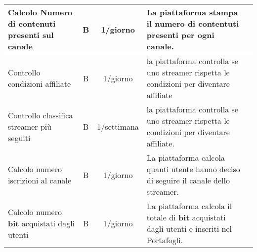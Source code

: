 \begin{longtable}{|l|c|c|p{2.5cm}|c}
  Calcolo Numero di contenuti presenti sul canale &B& 1/giorno &La piattaforma stampa il numero di contentuti presenti per ogni canale. \\\hline
  Controllo condizioni affiliate & B &1/giorno & la piattaforma controlla se uno streamer rispetta le condizioni per diventare affiliate  \\\hline
  Controllo classifica streamer più seguiti & B & 1/settimana  & la piattaforma controlla se uno streamer rispetta le condizioni per diventare affiliate. \\\hline
  Calcolo numero iscrizioni al canale &B&1/giorno&La piattaforma calcola quanti utente hanno deciso di seguire il canale dello streamer.\\\hline
  Calcolo numero \textbf{bit} acquistati dagli utenti &B& 1/giorno &La piattaforma calcola il totale di \textbf{bit} acquistati dagli utenti e inseriti nel Portafogli.\\\hline
\end{longtable}
\normalsize

